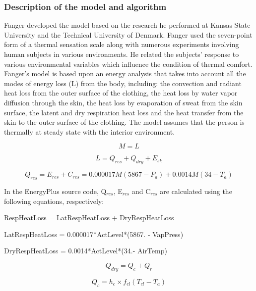 \subsubsection{Description of the model and algorithm}\label{description-of-the-model-and-algorithm}

Fanger developed the model based on the research he performed at Kansas State University and the Technical University of Denmark. Fanger used the seven-point form of a thermal sensation scale along with numerous experiments involving human subjects in various environments. He related the subjects' response to various environmental variables which influence the condition of thermal comfort. Fanger's model is based upon an energy analysis that takes into account all the modes of energy loss (L) from the body, including: the convection and radiant heat loss from the outer surface of the clothing, the heat loss by water vapor diffusion through the skin, the heat loss by evaporation of sweat from the skin surface, the latent and dry respiration heat loss and the heat transfer from the skin to the outer surface of the clothing. The model assumes that the person is thermally at steady state with the interior environment.

\begin{equation}
M = L
\end{equation}

\begin{equation}
L = {Q_{res}} + {Q_{dry}} + {E_{sk}}
\end{equation}

\begin{equation}
{Q_{res}} = {E_{res}} + {C_{res}} = 0.000017M(5867 - {P_a}) + 0.0014M(34 - {T_a})
\end{equation}

In the EnergyPlus source code,  Q\(_{res}\), E\(_{res}\) and C\(_{res}\) are calculated using the following equations, respectively:

RespHeatLoss = LatRespHeatLoss + DryRespHeatLoss

LatRespHeatLoss = 0.000017*ActLevel*(5867. - VapPress)

DryRespHeatLoss = 0.0014*ActLevel*(34.- AirTemp)

\begin{equation}
{Q_{dry}} = {Q_c} + {Q_r}
\end{equation}

\begin{equation}
{Q_c} = {h_c} \times {f_{cl}}({T_{cl}} - {T_a})
\end{equation}

